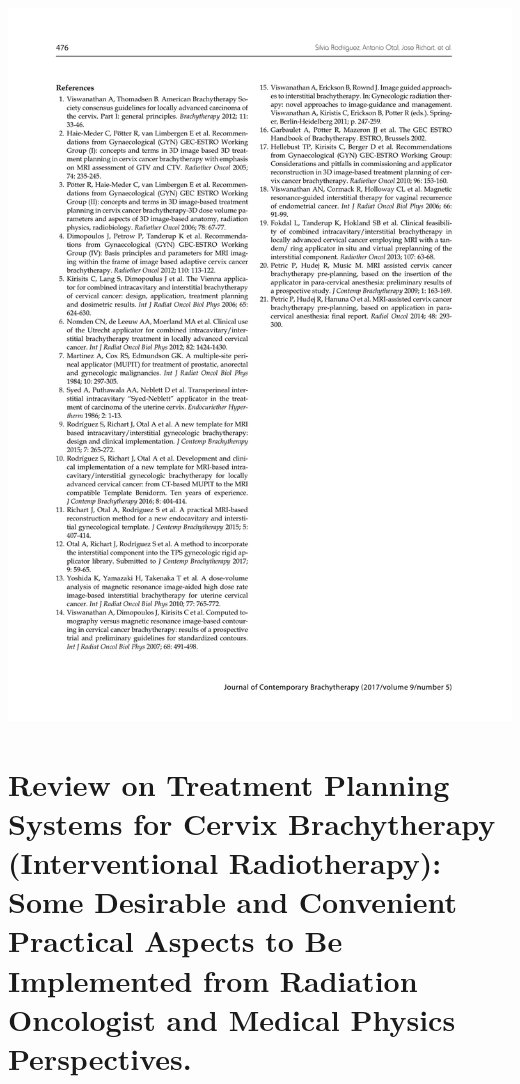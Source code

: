 \documentclass[
  a4paper,
]{scrreprt}
\begin{document}
\includegraphics{articulos/preplan/preplan-5.png}

\hypertarget{review-on-treatment-planning-systems-for-cervix-brachytherapy-interventional-radiotherapy-some-desirable-and-convenient-practical-aspects-to-be-implemented-from-radiation-oncologist-and-medical-physics-perspectives.}{%
\section{Review on Treatment Planning Systems for Cervix Brachytherapy
(Interventional Radiotherapy): Some Desirable and Convenient Practical
Aspects to Be Implemented from Radiation Oncologist and Medical Physics
Perspectives.}\label{review-on-treatment-planning-systems-for-cervix-brachytherapy-interventional-radiotherapy-some-desirable-and-convenient-practical-aspects-to-be-implemented-from-radiation-oncologist-and-medical-physics-perspectives.}}
\end{document}
